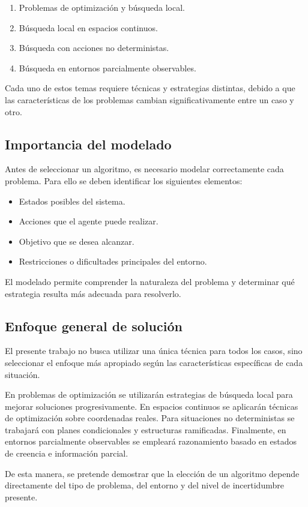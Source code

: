 \begin{enumerate}
    \item Problemas de optimización y búsqueda local.
    \item Búsqueda local en espacios continuos.
    \item Búsqueda con acciones no deterministas.
    \item Búsqueda en entornos parcialmente observables.
\end{enumerate}

Cada uno de estos temas requiere técnicas y estrategias distintas, debido a que las características de los problemas cambian significativamente entre un caso y otro.

\subsection{Importancia del modelado}

Antes de seleccionar un algoritmo, es necesario modelar correctamente cada problema. Para ello se deben identificar los siguientes elementos:

\begin{itemize}
    \item Estados posibles del sistema.
    \item Acciones que el agente puede realizar.
    \item Objetivo que se desea alcanzar.
    \item Restricciones o dificultades principales del entorno.
\end{itemize}

El modelado permite comprender la naturaleza del problema y determinar qué estrategia resulta más adecuada para resolverlo.

\subsection{Enfoque general de solución}

El presente trabajo no busca utilizar una única técnica para todos los casos, sino seleccionar el enfoque más apropiado según las características específicas de cada situación.

En problemas de optimización se utilizarán estrategias de búsqueda local para mejorar soluciones progresivamente. En espacios continuos se aplicarán técnicas de optimización sobre coordenadas reales. Para situaciones no deterministas se trabajará con planes condicionales y estructuras ramificadas. Finalmente, en entornos parcialmente observables se empleará razonamiento basado en estados de creencia e información parcial.

De esta manera, se pretende demostrar que la elección de un algoritmo depende directamente del tipo de problema, del entorno y del nivel de incertidumbre presente.